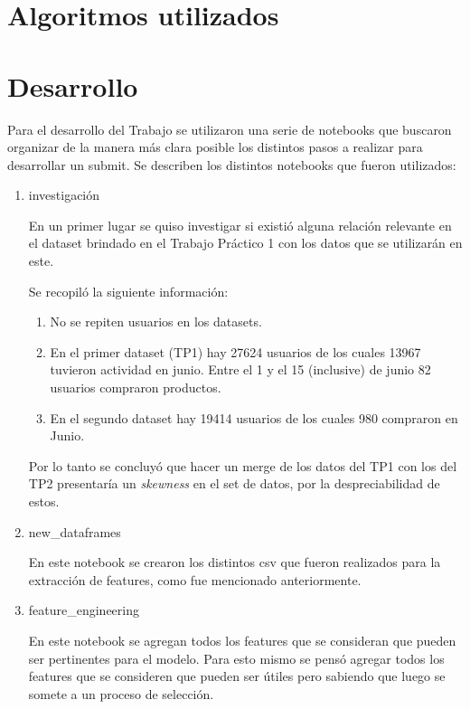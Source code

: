 \documentclass[a4paper]{article}
\begin{document}
\section{Algoritmos utilizados}

\section{Desarrollo}
Para el desarrollo del Trabajo se utilizaron una serie de notebooks que buscaron organizar de la manera más clara posible los distintos pasos a realizar para desarrollar un submit. Se describen los distintos notebooks que fueron utilizados:

\begin{enumerate} 
	
\item investigación

En un primer lugar se quiso investigar si existió alguna relación relevante en el dataset brindado en el Trabajo Práctico 1 con los datos que se utilizarán en este. 

Se recopiló la siguiente información:

\begin{enumerate}

\item No se repiten usuarios en los datasets.
\item En el primer dataset (TP1) hay 27624 usuarios de los cuales 13967 tuvieron actividad en junio. Entre el 1 y el 15 (inclusive) de junio 82 usuarios compraron productos.
\item En el segundo dataset hay 19414 usuarios de los cuales 980 compraron en Junio.

\end{enumerate}

Por lo tanto se concluyó que hacer un merge de los datos del TP1 con los del TP2 presentaría un \textit{skewness} en el set de datos, por la despreciabilidad de estos.
	
\item new\_dataframes 	

En este notebook se crearon los distintos csv que fueron realizados para la extracción de features, como fue mencionado anteriormente. 

\item feature\_engineering

En este notebook se agregan todos los features que se consideran que pueden ser pertinentes para el modelo. Para esto mismo se pensó agregar todos los features que se consideren que pueden ser útiles pero sabiendo que luego se somete a un proceso de selección. 


\end{enumerate}
\end{document}
